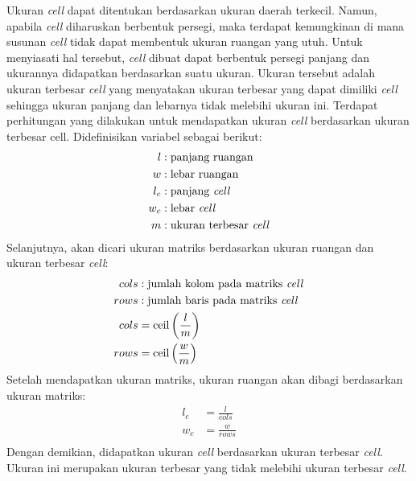 Ukuran \textit{cell} dapat ditentukan berdasarkan ukuran daerah terkecil. Namun, apabila \textit{cell} diharuskan berbentuk persegi, maka terdapat kemungkinan di mana susunan \textit{cell} tidak dapat membentuk ukuran ruangan yang utuh. Untuk menyiasati hal tersebut, \textit{cell} dibuat dapat berbentuk persegi panjang dan ukurannya didapatkan berdasarkan suatu ukuran. Ukuran tersebut adalah ukuran terbesar \textit{cell} yang menyatakan ukuran terbesar yang dapat dimiliki \textit{cell} sehingga ukuran panjang dan lebarnya tidak melebihi ukuran ini. Terdapat perhitungan yang dilakukan untuk mendapatkan ukuran \textit{cell} berdasarkan ukuran terbesar cell. Didefinisikan variabel sebagai berikut:
\begin{equation}
	\begin{split}
		l &: \text{panjang ruangan}\\
		w &: \text{lebar ruangan}\\
		l_c &: \text{panjang \textit{cell}}\\
		w_c &: \text{lebar \textit{cell}}\\
		m &: \text{ukuran terbesar \textit{cell}}\\
	\end{split}
\end{equation}
Selanjutnya, akan dicari ukuran matriks berdasarkan ukuran ruangan dan ukuran terbesar \textit{cell}:
\begin{equation}
	\begin{split}
		cols &: \text{jumlah kolom pada matriks \textit{cell}}\\
		rows &: \text{jumlah baris pada matriks \textit{cell}}\\
		cols &= \text{ceil}\left(\frac{l}{m}\right)\\
		rows &= \text{ceil}\left(\frac{w}{m}\right)\\
	\end{split}
\end{equation}
Setelah mendapatkan ukuran matriks, ukuran ruangan akan dibagi berdasarkan ukuran matriks:
\begin{equation}
	\begin{split}
		l_c &= \frac{l}{cols}\\
		w_c &= \frac{w}{rows}\\
	\end{split}
\end{equation}
Dengan demikian, didapatkan ukuran \textit{cell} berdasarkan ukuran terbesar \textit{cell}. Ukuran ini merupakan ukuran terbesar yang tidak melebihi ukuran terbesar \textit{cell}.


